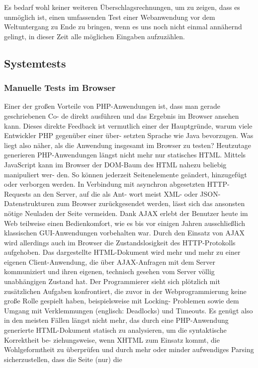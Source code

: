 Es bedarf wohl keiner weiteren Überschlagsrechnungen, um zu zeigen, dass es unmöglich 
ist, einen umfassenden Test einer Webanwendung vor dem Weltuntergang zu Ende zu bringen, 
wenn es uns noch nicht einmal annähernd gelingt, in dieser Zeit alle möglichen
Eingaben aufzuzählen.

\subsection{Systemtests}
\subsubsection{Manuelle Tests im Browser}
Einer der großen Vorteile von PHP-Anwendungen ist, dass man gerade geschriebenen Co-
de direkt ausführen und das Ergebnis im Browser ansehen kann. Dieses direkte Feedback
ist vermutlich einer der Hauptgründe, warum viele Entwickler PHP gegenüber einer über-
setzten Sprache wie Java bevorzugen. Was liegt also näher, als die Anwendung insgesamt
im Browser zu testen?
Heutzutage generieren PHP-Anwendungen längst nicht mehr nur statisches HTML. Mittels
JavaScript kann im Browser der DOM-Baum des HTML nahezu beliebig manipuliert wer-
den. So können jederzeit Seitenelemente geändert, hinzugefügt oder verborgen werden.
In Verbindung mit asynchron abgesetzten HTTP-Requests an den Server, auf die als Ant-
wort meist XML- oder JSON-Datenstrukturen zum Browser zurückgesendet werden, lässt
sich das ansonsten nötige Neuladen der Seite vermeiden. Dank AJAX erlebt der Benutzer
heute im Web teilweise einen Bedienkomfort, wie es bis vor einigen Jahren ausschließlich
klassischen GUI-Anwendungen vorbehalten war.
Durch den Einsatz von AJAX wird allerdings auch im Browser die Zustandslosigkeit des
HTTP-Protokolls aufgehoben. Das dargestellte HTML-Dokument wird mehr und mehr zu
einer eigenen Client-Anwendung, die über AJAX-Anfragen mit dem Server kommuniziert
und ihren eigenen, technisch gesehen vom Server völlig unabhängigen Zustand hat. Der
Programmierer sieht sich plötzlich mit zusätzlichen Aufgaben konfrontiert, die zuvor in
der Webprogrammierung keine große Rolle gespielt haben, beispielsweise mit Locking-
Problemen sowie dem Umgang mit Verklemmungen (englisch: Deadlocks) und Timeouts.
Es genügt also in den meisten Fällen längst nicht mehr, das durch eine PHP-Anwendung
generierte HTML-Dokument statisch zu analysieren, um die syntaktische Korrektheit be-
ziehungsweise, wenn XHTML zum Einsatz kommt, die Wohlgeformtheit zu überprüfen
und durch mehr oder minder aufwendiges Parsing sicherzustellen, dass die Seite (nur) die
